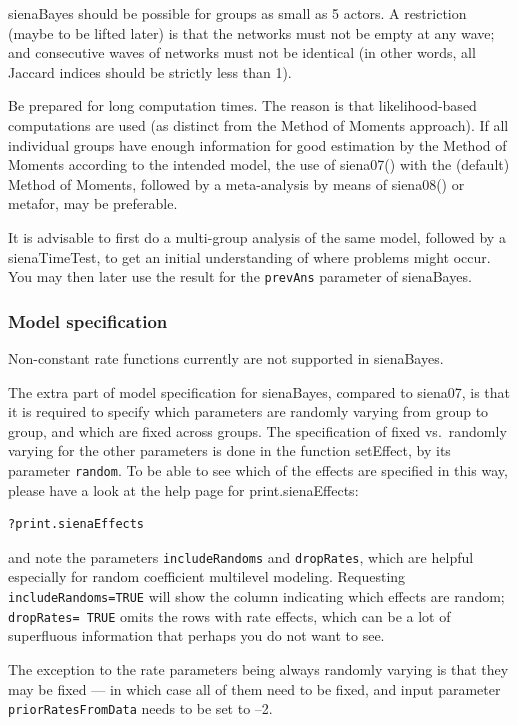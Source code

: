 \documentclass[a4paper,fleqn,11pt]{article}
\newcommand{\+}{\, + \,}
\newcommand{\sfn}[1]{\textsf{#1}}
\begin{document}
\sfn{sienaBayes} should be possible for groups as small as 5 actors.
A restriction (maybe to be lifted later) is that the networks must not be
empty at any wave; and consecutive waves of networks must not be identical
(in other words, all Jaccard indices should be strictly less than 1).

Be prepared for long computation times. The reason is that likelihood-based
computations are used (as distinct from the Method of Moments approach).
If all individual groups have enough information for good estimation by
the Method of Moments according to the intended model,
the use of \sfn{siena07()} with the (default) Method of Moments, followed by a
meta-analysis by means of \sfn{siena08()} or \sfn{metafor}, may be preferable.

It is advisable to first do a multi-group analysis of the same model,
followed by a \sfn{sienaTimeTest}, to get an initial understanding of where problems
might occur. You may then later use the result for the \texttt{prevAns}
parameter of \sfn{sienaBayes}.


\subsubsection{Model specification}

Non-constant rate functions currently are not supported in \sfn{sienaBayes}.

The extra part of model specification for \sfn{sienaBayes},
compared to \sfn{siena07},
is that it is required to specify which parameters are
randomly varying from group to group, and which are fixed across groups.
The specification of fixed vs.\ randomly varying
for the other parameters is done in the function
\sfn{setEffect}, by its parameter \texttt{random}.
To be able to see which of the effects are specified in this way,
please have a look at the help page for \sfn{print.sienaEffects}:
\begin{verbatim}
?print.sienaEffects
\end{verbatim}
and note the parameters \texttt{includeRandoms}
and \texttt{dropRates}, which are helpful especially for
random coefficient multilevel modeling.
Requesting \texttt{includeRandoms=TRUE} will show the column indicating
which effects are random; \texttt{dropRates= TRUE} omits the
rows with rate effects, which can be a lot of superfluous information
that perhaps you do not want to see.

The exception to the rate parameters being always randomly varying
is that they may be fixed --- in which case all of them need to be fixed,
and input parameter \\
\texttt{priorRatesFromData} needs to be set to --2.
\medskip
\end{document}
